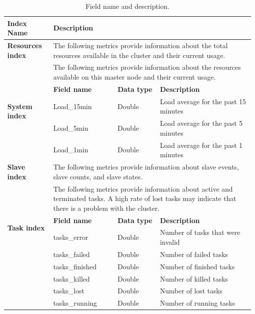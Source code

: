 \documentclass[12pt,oneside,openright,a4paper]{cpe-english-project}
\begin{document}
\begin{table}[!h]
  \caption{Field name and description.}\label{tbl:fieldName}
    \begin{tabular}{|p{}|p{}|p{}|p{}|}
    \hline
    \textbf{Index Name} & \multicolumn{3}{p{0.7\textwidth}|}{\textbf{Description}}  \\ 
    \hline
    \textbf{Resources index} & \multicolumn{3}{p{0.7\textwidth}|}{ The following metrics provide information about the total resources available in the cluster and their current usage.} \\ 
    \hline
    \multirow{5}{*}{\textbf{System index}} & \multicolumn{3}{p{0.7\textwidth}|}{ The following metrics provide information about the resources available on this master node and their current usage.} \\ 
    \cline{2-4} & \textbf{Field name} & \textbf{Data type} & \textbf{Description} \\ 
    \cline{2-4} & Load\_15min & Double & Load average for the past 15 minutes \\ 
    \cline{2-4} & Load\_5min & Double & Load average for the past 5 minutes \\ 
    \cline{2-4} & Load\_1min & Double & Load average for the past 1 minutes \\ 
    \hline
    \textbf{Slave index} & \multicolumn{3}{p{0.7\textwidth}|}{ The following metrics provide information about slave events, slave counts, and slave states.} \\ 
    \hline
    \multirow{5}{*}{\textbf{Task index}} & \multicolumn{3}{p{0.7\textwidth}|}{ The following metrics provide information about active and terminated tasks. A high rate of lost tasks may indicate that there is a problem with the cluster.} \\ 
    \cline{2-4} & \textbf{Field name} & \textbf{Data type} & \textbf{Description} \\ 
    \cline{2-4} & tasks\_error & Double & Number of tasks that were invalid \\ 
    \cline{2-4} & tasks\_failed & Double & Number of failed tasks \\ 
    \cline{2-4} & tasks\_finished & Double & Number of finished tasks \\ 
    \cline{2-4} & tasks\_killed & Double & Number of killed tasks \\ 
    \cline{2-4} & tasks\_lost & Double & Number of lost tasks \\ 
    \cline{2-4} & tasks\_running & Double & Number of running tasks \\ 

\end{tabular}
\end{table}
\end{document}
